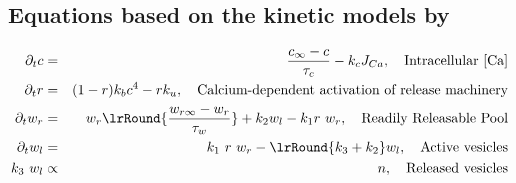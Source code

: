 \begin{appendix}

\section{Equations based on  the kinetic models by \cite{destexhe1998kinetic} }


\begin{eqnarray}
\partial_{t} c &=& \frac{c_{\infty}-c}{\tau_{c}} - k_{c} J_{Ca}, \quad \textrm{Intracellular [Ca]}
\\
\partial_{t} r &=& (1-r) k_{b} c^{4} - r  k_{u} , \quad \textrm{Calcium-dependent activation of release machinery}
\\
\partial_{t} w_{r} &=& w_{r} \lrRound{ \frac{w_{r\infty}-w_{r}}{\tau_{w}}} + k_{2}w_{l} -  k_{1}r~w_{r}, \quad \textrm{Readily Releasable Pool}
\\
\partial_{t} w_{l}&=& k_{1} ~r~w_{r}  - \lrRound{k_{3} +  k_{2}}w_{l}  , \quad \textrm{Active  vesicles}
\\
k_{3}~w_{l} 
& \propto & n, \quad \textrm{Released  vesicles}
\end{eqnarray}


\end{appendix}
